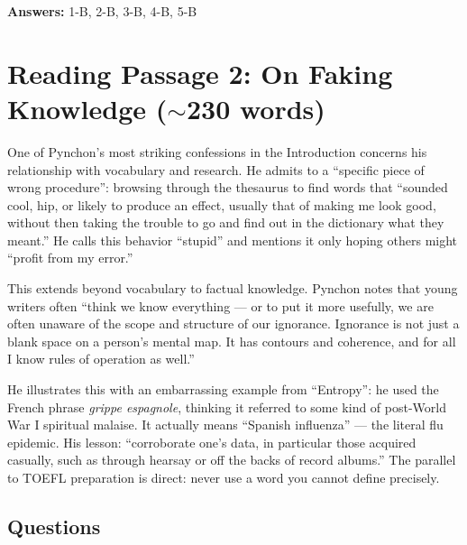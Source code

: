 \documentclass[10pt,a4paper]{article}
\begin{document}
\textbf{Answers:} 1-B, 2-B, 3-B, 4-B, 5-B

\section*{Reading Passage 2: On Faking Knowledge ($\sim$230 words)}

\begin{tcolorbox}[colback=white, colframe=black]
\small
One of Pynchon's most striking confessions in the Introduction
concerns his relationship with vocabulary and research. He admits to
a ``specific piece of wrong procedure'': browsing through the
thesaurus to find words that ``sounded cool, hip, or likely to
produce an effect, usually that of making me look good, without then
taking the trouble to go and find out in the dictionary what they
meant.'' He calls this behavior ``stupid'' and mentions it only
hoping others might ``profit from my error.''

This extends beyond vocabulary to factual knowledge. Pynchon notes
that young writers often ``think we know everything --- or to put it
more usefully, we are often unaware of the scope and structure of
our ignorance. Ignorance is not just a blank space on a person's
mental map. It has contours and coherence, and for all I know rules
of operation as well.''

He illustrates this with an embarrassing example from ``Entropy'':
he used the French phrase \emph{grippe espagnole}, thinking it
referred to some kind of post-World War I spiritual malaise. It
actually means ``Spanish influenza'' --- the literal flu epidemic.
His lesson: ``corroborate one's data, in particular those acquired
casually, such as through hearsay or off the backs of record albums.''
The parallel to TOEFL preparation is direct: never use a word you
cannot define precisely.
\end{tcolorbox}

\subsection*{Questions}
\end{document}
